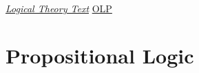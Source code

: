 \documentclass[b5paper]{memoir}
\begin{document}

\begin{titlingpage}

\vfill


\oluselicense
{\href{https://github.com/OpenLogicProject/OpenLogic/tree/master/courses/sample}{\textit{Logical Theory Text}}}
{\href{http://openlogicproject.org/}{OLP}}
\end{titlingpage}

\frontmatter
\pagestyle{ruled}

\tableofcontents*

\mainmatter




\part{Propositional Logic}



\end{document}
